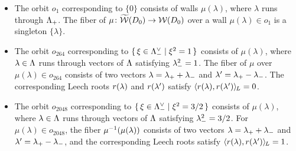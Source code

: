 \documentclass{amsart} %
\begin{document}
\begin{itemize}
\item[($1$)]
The orbit $o_1$ corresponding to $\{0\}$
consists of walls $\mu(\lambda)$,
where $\lambda$ runs through $\Lambda_{+}$.
The fiber of $\mu\colon \widetilde{\mathord{\mathcal{W}}}(D_0)\to\mathord{\mathcal{W}}(D_0)$ 
over a wall $\mu(\lambda)\in o_1$ is a singleton $\{\lambda\}$.
%
\item[($264$)]
The orbit $o_{264}$ corresponding to $\{\,{\xi\in \Lambda_{-}^{\vee}}\mid {\xi^2=1} \,\}$
consists of $\mu(\lambda)$,
where $\lambda\in \Lambda$ runs through
vectors of $\Lambda$ satisfying ${\lambda}_{-}^2=1$.
The fiber of $\mu$ 
over $\mu(\lambda)\in o_{264}$ consists 
of two vectors
$\lambda={\lambda}_{+}+{\lambda}_{-}$ and $\lambda^{\prime}={\lambda}_{+}-{\lambda}_{-}$.
The corresponding Leech roots 
$r(\lambda)$ and $r(\lambda^{\prime})$ satisfy
$\langle r(\lambda), r(\lambda^{\prime}) \rangle_{\hskip -1pt L}=0$.
%
\item[($2048$)]
The orbit $o_{2048}$ corresponding to $\{\,{\xi\in \Lambda_{-}^{\vee}}\mid {\xi^2=3/2} \,\}$
consists of $\mu(\lambda)$,
where $\lambda\in \Lambda$ runs through
vectors of $\Lambda$ satisfying ${\lambda}_{-}^2=3/2$.
For $\mu(\lambda)\in o_{2048}$, the  fiber
 $\mu^{-1}(\mu(\lambda))$ consists 
of two vectors
$\lambda={\lambda}_{+}+{\lambda}_{-}$ and $\lambda^{\prime}={\lambda}_{+}-{\lambda}_{-}$, and 
the corresponding Leech roots 
 satisfy
$\langle r(\lambda), r(\lambda^{\prime}) \rangle_{\hskip -1pt L}=1$.

\end{itemize}
%
\end{document}
